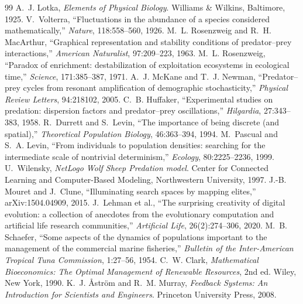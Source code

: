 \begin{thebibliography}{99}\small
\setlength{\itemsep}{1pt}
 A.~J. Lotka, \emph{Elements of Physical Biology}. Williams \& Wilkins, Baltimore, 1925.
 V.~Volterra, ``Fluctuations in the abundance of a species considered mathematically,'' \emph{Nature}, 118:558--560, 1926.
 M.~L. Rosenzweig and R.~H. MacArthur, ``Graphical representation and stability conditions of predator--prey interactions,'' \emph{American Naturalist}, 97:209--223, 1963.
 M.~L. Rosenzweig, ``Paradox of enrichment: destabilization of exploitation ecosystems in ecological time,'' \emph{Science}, 171:385--387, 1971.
 A.~J. McKane and T.~J. Newman, ``Predator--prey cycles from resonant amplification of demographic stochasticity,'' \emph{Physical Review Letters}, 94:218102, 2005.
 C.~B. Huffaker, ``Experimental studies on predation: dispersion factors and predator--prey oscillations,'' \emph{Hilgardia}, 27:343--383, 1958.
 R.~Durrett and S.~Levin, ``The importance of being discrete (and spatial),'' \emph{Theoretical Population Biology}, 46:363--394, 1994.
 M.~Pascual and S.~A. Levin, ``From individuals to population densities: searching for the intermediate scale of nontrivial determinism,'' \emph{Ecology}, 80:2225--2236, 1999.
 U.~Wilensky, \emph{NetLogo Wolf Sheep Predation model}. Center for Connected Learning and Computer-Based Modeling, Northwestern University, 1997.
 J.-B. Mouret and J.~Clune, ``Illuminating search spaces by mapping elites,'' arXiv:1504.04909, 2015.
 J.~Lehman et al., ``The surprising creativity of digital evolution: a collection of anecdotes from the evolutionary computation and artificial life research communities,'' \emph{Artificial Life}, 26(2):274--306, 2020.
 M.~B. Schaefer, ``Some aspects of the dynamics of populations important to the management of the commercial marine fisheries,'' \emph{Bulletin of the Inter-American Tropical Tuna Commission}, 1:27--56, 1954.
 C.~W. Clark, \emph{Mathematical Bioeconomics: The Optimal Management of Renewable Resources}, 2nd ed. Wiley, New York, 1990.
 K.~J. {\AA}str{\"o}m and R.~M. Murray, \emph{Feedback Systems: An Introduction for Scientists and Engineers}. Princeton University Press, 2008.
\end{thebibliography}
